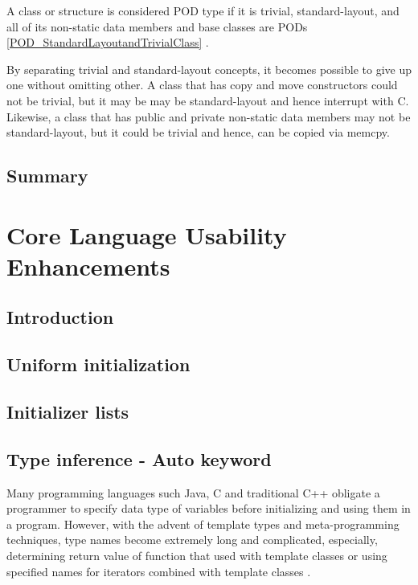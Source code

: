 \documentclass[11pt]{report}
\begin{document}
A class or structure is considered POD type if it is trivial, standard-layout, and all of its non-static data members and base classes are PODs \ref{POD_StandardLayoutandTrivialClass} \cite {ISO:2011:Cpplanguage}.
\newline

By separating trivial and standard-layout concepts, it becomes possible to give up one without omitting other. A class that has copy  and move constructors could not be trivial, but it may be may be standard-layout and hence interrupt with C. Likewise, a class that has  public and private non-static data members may not be standard-layout, but it could be trivial and hence, can be copied via memcpy.


\section{Summary}
\label{sec: Summary}


\chapter{Core Language Usability Enhancements}
\label{chapter: Usability Enhancements}

\section{Introduction}
\label{sect: Introduction}

\section{Uniform initialization}
\label{section:Uniform initialization}

\section{Initializer lists}
\label{section: Initializer lists}


\section{Type inference - Auto keyword}
\label{section: Auto keyword}
Many programming languages such Java, C and traditional C++ obligate a programmer to specify data type of variables before initializing and using them in a program. However, with the advent of template types and meta-programming techniques, type names become extremely long and complicated, especially, determining return value of function that used with template classes or using specified names for iterators combined with template classes \cite{Horstmann:2008:BC}.
\newline
\end{document}
